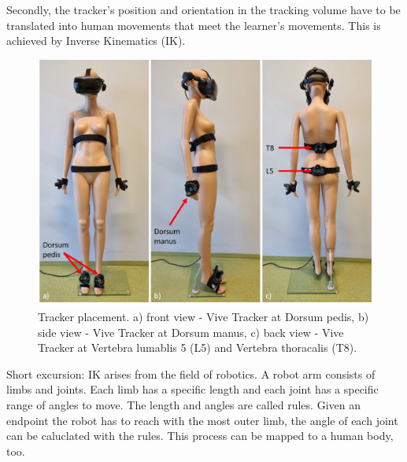 Secondly, the tracker's position and orientation in the tracking volume have to be translated into human movements that meet the learner's movements. This is achieved by Inverse Kinematics (IK).\\
\begin{figure}[htb]
	\centering
	\includegraphics[width=\textwidth]{figures/trackerPlacement.png}	
	\caption[Tracker placement]{Tracker placement. a) front view - Vive Tracker at Dorsum pedis, b) side view - Vive Tracker at Dorsum manus, c) back view - Vive Tracker at Vertebra lumablis 5 (L5) and Vertebra thoracalis (T8).}
	\label{fig:tracker_placement}
\end{figure}
Short excursion: IK arises from the field of robotics. A robot arm consists of limbs and joints. Each limb has a specific length and each joint has a specific range of angles to move. The length and angles are called rules. Given an endpoint the robot has to reach with the most outer limb, the angle of each joint can be caluclated with the rules. This process can be mapped to a human body, too.\\

